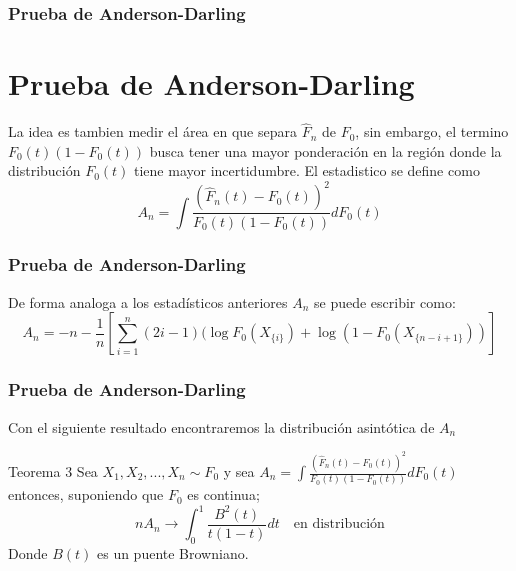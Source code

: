 \documentclass[aspectratio=169,spanish]{beamer}
\begin{document}
\begin{frame}
\frametitle{Prueba de Anderson-Darling}
\section{Prueba de Anderson-Darling}
La idea es tambien medir el área en que separa $\hat{F}_n$ de $F_0$, sin embargo, el termino $F_0(t)(1-F_0(t))$ busca tener una mayor ponderación en la región donde la distribución $F_0(t)$ tiene mayor incertidumbre. El estadistico se define como 
$$A_n=\int\frac{(\hat{F}_n(t)-F_0(t))^2}{F_0(t)(1-F_0(t))}dF_0(t)$$
\end{frame}
\begin{frame}
\frametitle{Prueba de Anderson-Darling}
De forma analoga a los estadísticos anteriores $A_n$ se puede escribir como:
$$A_n=-n-\frac{1}{n}\left[\sum_{i=1}^{n}(2i-1)(\log F_0(X_{\{i\}})+\log(1-F_0(X_{\{n-i+1\}}))\right]$$
\end{frame}
\begin{frame}
\frametitle{Prueba de Anderson-Darling}
Con el siguiente resultado encontraremos la distribución asintótica de $A_n$
\begin{block}{Teorema 3}
Sea $X_1,X_2,...,X_n\sim F_0$ y sea $A_n=\int\frac{(\hat{F}_n(t)-F_0(t))^2}{F_0(t)(1-F_0(t))}dF_0(t)$ entonces, suponiendo que $F_0$ es continua; $$nA_n \rightarrow \int_0^1\frac{B^2(t)}{t(1-t)}dt\quad \text{en distribución}$$
Donde $B(t)$ es un puente Browniano.
\end{block}
\end{frame}
\end{document}
